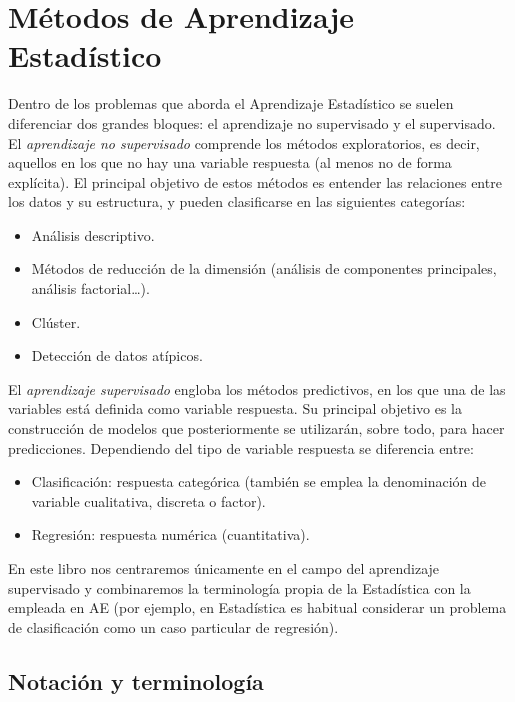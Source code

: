 \documentclass[
  spanish,
]{book}
\theoremstyle{break}
\theoremstyle{definition}
\theoremstyle{definition}
\theoremstyle{definition}
\theoremstyle{definition}
\theoremstyle{remark}
\begin{document}
\hypertarget{muxe9todos-de-aprendizaje-estaduxedstico}{%
\section{Métodos de Aprendizaje Estadístico}\label{muxe9todos-de-aprendizaje-estaduxedstico}}

Dentro de los problemas que aborda el Aprendizaje Estadístico se suelen diferenciar dos grandes bloques: el aprendizaje no supervisado y el supervisado. El \emph{aprendizaje no supervisado} comprende los métodos exploratorios, es decir, aquellos en los que no hay una variable respuesta (al menos no de forma explícita). El principal objetivo de estos métodos es entender las relaciones entre los datos y su estructura, y pueden clasificarse en las siguientes categorías:

\begin{itemize}
\item
  Análisis descriptivo.
\item
  Métodos de reducción de la dimensión (análisis de componentes principales, análisis factorial\ldots).
\item
  Clúster.
\item
  Detección de datos atípicos.
\end{itemize}

El \emph{aprendizaje supervisado} engloba los métodos predictivos, en los que una de las variables está definida como variable respuesta. Su principal objetivo es la construcción de modelos que posteriormente se utilizarán, sobre todo, para hacer predicciones. Dependiendo del tipo de variable respuesta se diferencia entre:

\begin{itemize}
\item
  Clasificación: respuesta categórica (también se emplea la denominación de variable cualitativa, discreta o factor).
\item
  Regresión: respuesta numérica (cuantitativa).
\end{itemize}

En este libro nos centraremos únicamente en el campo del aprendizaje supervisado y combinaremos la terminología propia de la Estadística con la empleada en AE (por ejemplo, en Estadística es habitual considerar un problema de clasificación como un caso particular de regresión).

\hypertarget{notacion}{%
\subsection{Notación y terminología}\label{notacion}}
\end{document}
